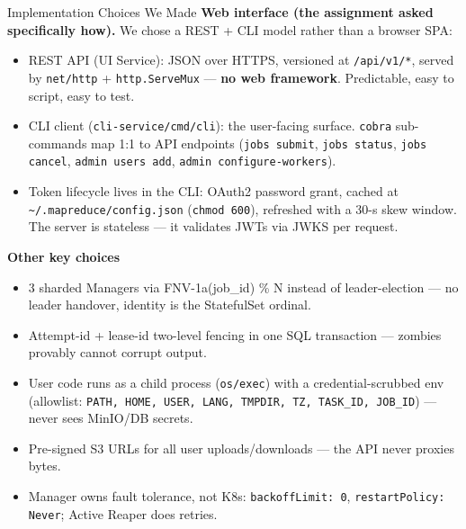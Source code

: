 \documentclass[11pt]{beamer}
\begin{document}
\begin{frame}[fragile]{Implementation Choices We Made}
\scriptsize
\textbf{Web interface (the assignment asked specifically how).}
We chose a \alert{REST + CLI} model rather than a browser SPA:
\begin{itemize}
  \item \alert{REST API} (UI Service): JSON over HTTPS, versioned at \texttt{/api/v1/*},
        served by \texttt{net/http} + \texttt{http.ServeMux} --- \textbf{no web framework}.
        Predictable, easy to script, easy to test.
  \item \alert{CLI client} (\texttt{cli-service/cmd/cli}): the user-facing surface.
        \texttt{cobra} sub-commands map 1:1 to API endpoints
        (\texttt{jobs submit}, \texttt{jobs status}, \texttt{jobs cancel},
        \texttt{admin users add}, \texttt{admin configure-workers}).
  \item \alert{Token lifecycle lives in the CLI}: OAuth2 password grant, cached at
        \texttt{\textasciitilde/.mapreduce/config.json} (\texttt{chmod 600}), refreshed with a 30-s skew window.
        The server is \alert{stateless} --- it validates JWTs via JWKS per request.
\end{itemize}

\textbf{Other key choices}
\begin{itemize}
  \item \alert{3 sharded Managers via FNV-1a(job\_id) \% N} instead of leader-election ---
        no leader handover, identity is the StatefulSet ordinal.
  \item \alert{Attempt-id + lease-id} two-level fencing in one SQL transaction ---
        zombies provably cannot corrupt output.
  \item \alert{User code runs as a child process} (\texttt{os/exec}) with a
        \alert{credential-scrubbed env} (allowlist: \texttt{PATH, HOME, USER, LANG,
        TMPDIR, TZ, TASK\_ID, JOB\_ID}) --- never sees MinIO/DB secrets.
  \item \alert{Pre-signed S3 URLs} for all user uploads/downloads ---
        the API never proxies bytes.
  \item \alert{Manager owns fault tolerance, not K8s}: \texttt{backoffLimit: 0},
        \texttt{restartPolicy: Never}; Active Reaper does retries.
\end{itemize}
\end{frame}

\end{document}
